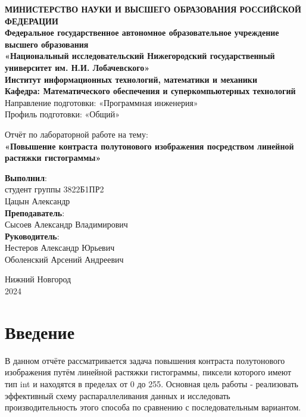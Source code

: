 \documentclass[a4paper,12pt]{article}
\begin{document}
\begin{titlepage}
\begin{center}
\textbf{МИНИСТЕРСТВО НАУКИ И ВЫСШЕГО ОБРАЗОВАНИЯ РОССИЙСКОЙ ФЕДЕРАЦИИ} \\
\textbf{Федеральное государственное автономное образовательное учреждение высшего образования} \\
\textbf{«Национальный исследовательский Нижегородский государственный университет им. Н.И. Лобачевского»} \\[1cm]
\textbf{Институт информационных технологий, математики и механики }\\[0.5cm]
\textbf{Кафедра: Математического обеспечения и суперкомпьютерных технологий}\\[0.5cm]
Направление подготовки: «Программная инженерия»\\
Профиль подготовки: «Общий»\\

\vfill

Отчёт по лабораторной работе на тему:\\
{\Large
\textbf{«Повышение контраста полутонового изображения посредством линейной растяжки гистограммы»} \\
}
\vfill
\begin{flushright}
\textbf{Выполнил}:\\
студент группы 3822Б1ПР2 \\
Цацын Александр \\
\vspace{1cm}
\textbf{Преподаватель}: \\
Сысоев Александр Владимирович \\
\textbf{Руководитель}: \\
Нестеров Александр Юрьевич\\
Оболенский Арсений Андреевич\\
\end{flushright}
\vfill
Нижний Новгород \\
2024
\end{center}
\end{titlepage}



\tableofcontents
\newpage




\section{Введение}
В данном отчёте рассматривается задача повышения контраста полутонового изображения путём линейной растяжки гистограммы, пиксели которого имеют тип int и находятся в пределах от 0 до 255. Основная цель работы - реализовать эффективный схему распараллеливания данных и исследовать производительность этого способа по сравнению с последовательным вариантом.
\newpage
\end{document}
